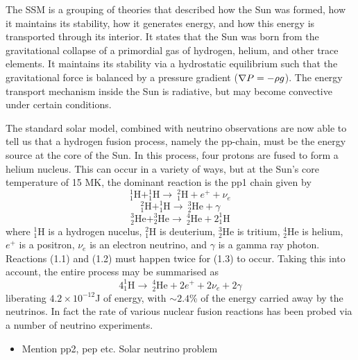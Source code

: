 The SSM is a grouping of theories that described how the Sun was formed, how it maintains its stability, how it generates energy, and how this energy is transported through its interior. It states that the Sun was born from the gravitational collapse of a primordial gas of hydrogen, helium, and other trace elements. It maintains its stability via a hydrostatic equilibrium such that the gravitational force is balanced by a pressure gradient (${\bf \nabla }{P}=-\rho g$). The energy transport mechanism inside the Sun is radiative, but may become convective under certain conditions.


The standard solar model, combined with neutrino observations are now able to tell us that a hydrogen fusion process, namely the pp-chain, must be the energy source at the core of the Sun. In this process, four protons are fused to form a helium nucleus. This can occur in a variety of ways, but at the Sun's core temperature of 15 MK, the dominant reaction is the pp1 chain given by
\begin{equation}
^{1}_1\mathrm{H} + ^{1}_1\mathrm{H} \rightarrow ~^{2}_1\mathrm{H} + e^{+}  + \nu_e
\end{equation}
\begin{equation}
^{2}_1\mathrm{H} + ^{1}_1\mathrm{H} \rightarrow ~^{3}_2\mathrm{He} + \gamma
\end{equation}
\begin{equation}
^{3}_2\mathrm{He}+^{3}_2\mathrm{He} \rightarrow ~^{4}_2\mathrm{He} + 2^{1}_1\mathrm{H}
\end{equation}
where $^{1}_1\mathrm{H}$ is a hydrogen nucelus, $^{2}_1\mathrm{H}$ is deuterium, $^{3}_2\mathrm{He}$ is tritium, $^{4}_2\mathrm{He}$ is helium, $e^{+}$ is a positron, $\nu_e$ is an electron neutrino, and $\gamma$ is a gamma ray photon. Reactions (1.1) and (1.2) must happen twice for (1.3) to occur. Taking this into account, the entire process may be summarised as 
\begin{equation}
4 ^{1}_1\mathrm{H}  \rightarrow ~^{4}_2\mathrm{He} + 2e^{+} + 2\nu_e + 2\gamma
\end{equation}
liberating $4.2\times10^{-12}$J of energy, with $\sim2.4$\% of the energy carried away by the neutrinos. In fact the rate of various nuclear fusion reactions has been probed via a number of neutrino experiments. 

\begin{itemize}
\item Mention pp2, pep etc. Solar neutrino problem
\end{itemize}

